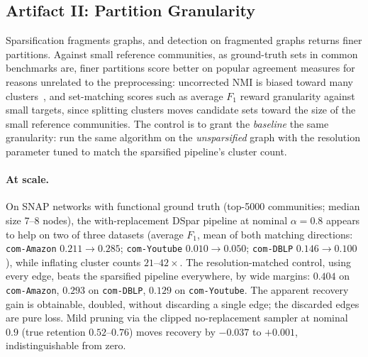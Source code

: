 \documentclass[10pt,journal,compsoc]{IEEEtran}
\begin{document}
\subsection{Artifact II: Partition Granularity}
\label{sec:artifact-granularity}

Sparsification fragments graphs, and detection on fragmented graphs returns finer partitions.
Against small reference communities, as ground-truth sets in common benchmarks are, finer partitions score better on popular agreement measures for reasons unrelated to the preprocessing: uncorrected NMI is biased toward many clusters~\cite{vinh2010information}, and set-matching scores such as average $F_1$ reward granularity against small targets, since splitting clusters moves candidate sets toward the size of the small reference communities.
The control is to grant the \emph{baseline} the same granularity: run the same algorithm on the \emph{unsparsified} graph with the resolution parameter tuned to match the sparsified pipeline's cluster count.

\paragraph{At scale.}
On SNAP networks with functional ground truth (top-5000 communities; median size 7--8 nodes), the with-replacement DSpar pipeline at nominal $\alpha=0.8$ appears to help on two of three datasets (average $F_1$, mean of both matching directions: \texttt{com-Amazon} $0.211 \to 0.285$; \texttt{com-Youtube} $0.010 \to 0.050$; \texttt{com-DBLP} $0.146 \to 0.100$), while inflating cluster counts $21$--$42\times$.
The resolution-matched control, using every edge, beats the sparsified pipeline everywhere, by wide margins: $0.404$ on \texttt{com-Amazon}, $0.293$ on \texttt{com-DBLP}, $0.129$ on \texttt{com-Youtube}.
The apparent recovery gain is obtainable, doubled, without discarding a single edge; the discarded edges are pure loss.
Mild pruning via the clipped no-replacement sampler at nominal $0.9$ (true retention $0.52$--$0.76$) moves recovery by $-0.037$ to $+0.001$, indistinguishable from zero.
\end{document}
